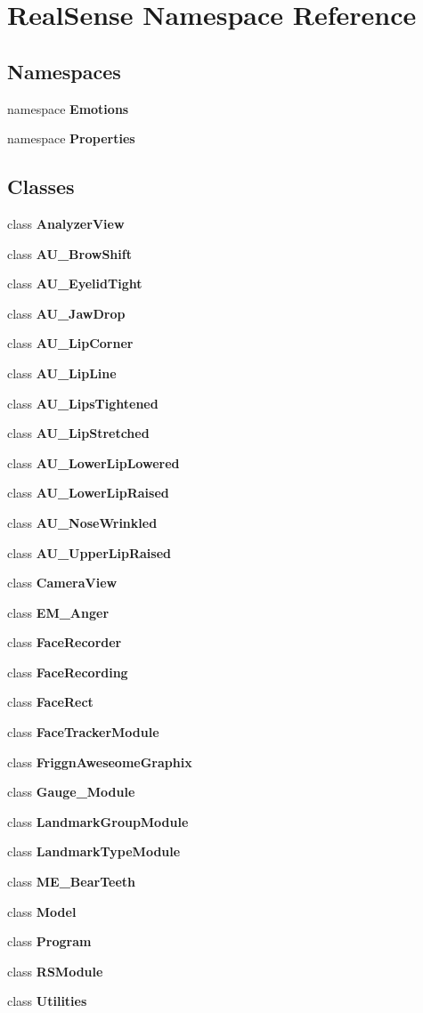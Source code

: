 \section{Real\+Sense Namespace Reference}
\label{namespace_real_sense}
\subsection*{Namespaces}
\begin{DoxyCompactItemize}
\item 
namespace \textbf{ Emotions}
\item 
namespace \textbf{ Properties}
\end{DoxyCompactItemize}
\subsection*{Classes}
\begin{DoxyCompactItemize}
\item 
class \textbf{ Analyzer\+View}
\item 
class \textbf{ A\+U\+\_\+\+Brow\+Shift}
\item 
class \textbf{ A\+U\+\_\+\+Eyelid\+Tight}
\item 
class \textbf{ A\+U\+\_\+\+Jaw\+Drop}
\item 
class \textbf{ A\+U\+\_\+\+Lip\+Corner}
\item 
class \textbf{ A\+U\+\_\+\+Lip\+Line}
\item 
class \textbf{ A\+U\+\_\+\+Lips\+Tightened}
\item 
class \textbf{ A\+U\+\_\+\+Lip\+Stretched}
\item 
class \textbf{ A\+U\+\_\+\+Lower\+Lip\+Lowered}
\item 
class \textbf{ A\+U\+\_\+\+Lower\+Lip\+Raised}
\item 
class \textbf{ A\+U\+\_\+\+Nose\+Wrinkled}
\item 
class \textbf{ A\+U\+\_\+\+Upper\+Lip\+Raised}
\item 
class \textbf{ Camera\+View}
\item 
class \textbf{ E\+M\+\_\+\+Anger}
\item 
class \textbf{ Face\+Recorder}
\item 
class \textbf{ Face\+Recording}
\item 
class \textbf{ Face\+Rect}
\item 
class \textbf{ Face\+Tracker\+Module}
\item 
class \textbf{ Friggn\+Aweseome\+Graphix}
\item 
class \textbf{ Gauge\+\_\+\+Module}
\item 
class \textbf{ Landmark\+Group\+Module}
\item 
class \textbf{ Landmark\+Type\+Module}
\item 
class \textbf{ M\+E\+\_\+\+Bear\+Teeth}
\item 
class \textbf{ Model}
\item 
class \textbf{ Program}
\item 
class \textbf{ R\+S\+Module}
\item 
class \textbf{ Utilities}
\end{DoxyCompactItemize}


